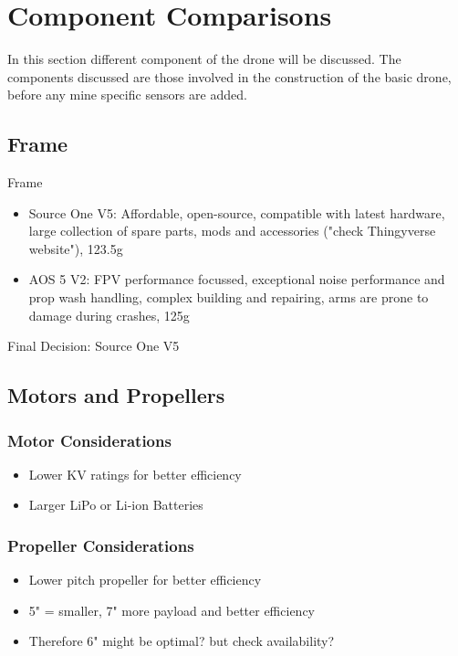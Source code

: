 \chapter{Component Comparisons}

In this section different component of the drone will be discussed. The components discussed are those involved in the construction of the basic drone, before any mine specific sensors are added.

\section{Frame}
	Frame
	\begin{itemize}
		\item Source One V5: Affordable, open-source, compatible with latest hardware, large collection of spare parts, mods and accessories ("check Thingyverse website"), 123.5g
		\item AOS 5 V2: FPV performance focussed, exceptional noise performance and prop wash handling, complex building and repairing, arms are prone to damage during crashes, 125g
	\end{itemize}

	Final Decision: Source One V5
	
\section{Motors and Propellers}
	\subsection{Motor Considerations}
		\begin{itemize}
			\item Lower KV ratings for better efficiency
			\item Larger LiPo or Li-ion Batteries
		\end{itemize}

	\subsection{Propeller Considerations}
		\begin{itemize}
			\item Lower pitch propeller for better efficiency
			\item 5" = smaller, 7" more payload and better efficiency
			\item Therefore 6" might be optimal? but check availability?
		\end{itemize}
	
